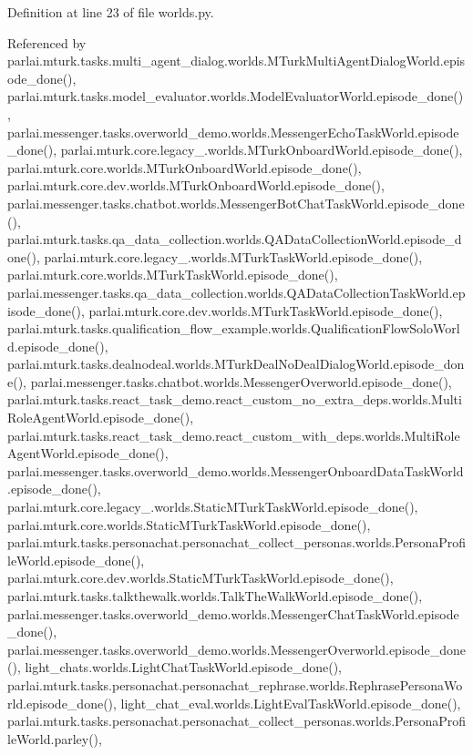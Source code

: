 Definition at line 23 of file worlds.\+py.



Referenced by parlai.\+mturk.\+tasks.\+multi\+\_\+agent\+\_\+dialog.\+worlds.\+M\+Turk\+Multi\+Agent\+Dialog\+World.\+episode\+\_\+done(), parlai.\+mturk.\+tasks.\+model\+\_\+evaluator.\+worlds.\+Model\+Evaluator\+World.\+episode\+\_\+done(), parlai.\+messenger.\+tasks.\+overworld\+\_\+demo.\+worlds.\+Messenger\+Echo\+Task\+World.\+episode\+\_\+done(), parlai.\+mturk.\+core.\+legacy\+\_.\+worlds.\+M\+Turk\+Onboard\+World.\+episode\+\_\+done(), parlai.\+mturk.\+core.\+worlds.\+M\+Turk\+Onboard\+World.\+episode\+\_\+done(), parlai.\+mturk.\+core.\+dev.\+worlds.\+M\+Turk\+Onboard\+World.\+episode\+\_\+done(), parlai.\+messenger.\+tasks.\+chatbot.\+worlds.\+Messenger\+Bot\+Chat\+Task\+World.\+episode\+\_\+done(), parlai.\+mturk.\+tasks.\+qa\+\_\+data\+\_\+collection.\+worlds.\+Q\+A\+Data\+Collection\+World.\+episode\+\_\+done(), parlai.\+mturk.\+core.\+legacy\+\_.\+worlds.\+M\+Turk\+Task\+World.\+episode\+\_\+done(), parlai.\+mturk.\+core.\+worlds.\+M\+Turk\+Task\+World.\+episode\+\_\+done(), parlai.\+messenger.\+tasks.\+qa\+\_\+data\+\_\+collection.\+worlds.\+Q\+A\+Data\+Collection\+Task\+World.\+episode\+\_\+done(), parlai.\+mturk.\+core.\+dev.\+worlds.\+M\+Turk\+Task\+World.\+episode\+\_\+done(), parlai.\+mturk.\+tasks.\+qualification\+\_\+flow\+\_\+example.\+worlds.\+Qualification\+Flow\+Solo\+World.\+episode\+\_\+done(), parlai.\+mturk.\+tasks.\+dealnodeal.\+worlds.\+M\+Turk\+Deal\+No\+Deal\+Dialog\+World.\+episode\+\_\+done(), parlai.\+messenger.\+tasks.\+chatbot.\+worlds.\+Messenger\+Overworld.\+episode\+\_\+done(), parlai.\+mturk.\+tasks.\+react\+\_\+task\+\_\+demo.\+react\+\_\+custom\+\_\+no\+\_\+extra\+\_\+deps.\+worlds.\+Multi\+Role\+Agent\+World.\+episode\+\_\+done(), parlai.\+mturk.\+tasks.\+react\+\_\+task\+\_\+demo.\+react\+\_\+custom\+\_\+with\+\_\+deps.\+worlds.\+Multi\+Role\+Agent\+World.\+episode\+\_\+done(), parlai.\+messenger.\+tasks.\+overworld\+\_\+demo.\+worlds.\+Messenger\+Onboard\+Data\+Task\+World.\+episode\+\_\+done(), parlai.\+mturk.\+core.\+legacy\+\_.\+worlds.\+Static\+M\+Turk\+Task\+World.\+episode\+\_\+done(), parlai.\+mturk.\+core.\+worlds.\+Static\+M\+Turk\+Task\+World.\+episode\+\_\+done(), parlai.\+mturk.\+tasks.\+personachat.\+personachat\+\_\+collect\+\_\+personas.\+worlds.\+Persona\+Profile\+World.\+episode\+\_\+done(), parlai.\+mturk.\+core.\+dev.\+worlds.\+Static\+M\+Turk\+Task\+World.\+episode\+\_\+done(), parlai.\+mturk.\+tasks.\+talkthewalk.\+worlds.\+Talk\+The\+Walk\+World.\+episode\+\_\+done(), parlai.\+messenger.\+tasks.\+overworld\+\_\+demo.\+worlds.\+Messenger\+Chat\+Task\+World.\+episode\+\_\+done(), parlai.\+messenger.\+tasks.\+overworld\+\_\+demo.\+worlds.\+Messenger\+Overworld.\+episode\+\_\+done(), light\+\_\+chats.\+worlds.\+Light\+Chat\+Task\+World.\+episode\+\_\+done(), parlai.\+mturk.\+tasks.\+personachat.\+personachat\+\_\+rephrase.\+worlds.\+Rephrase\+Persona\+World.\+episode\+\_\+done(), light\+\_\+chat\+\_\+eval.\+worlds.\+Light\+Eval\+Task\+World.\+episode\+\_\+done(), parlai.\+mturk.\+tasks.\+personachat.\+personachat\+\_\+collect\+\_\+personas.\+worlds.\+Persona\+Profile\+World.\+parley(), 
